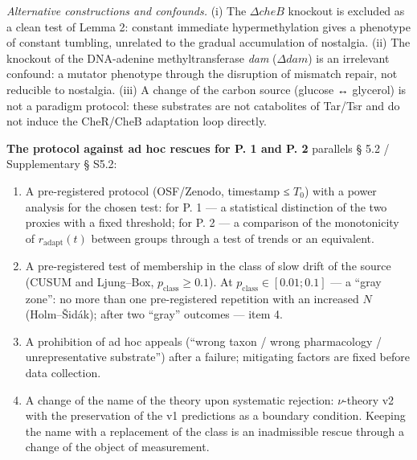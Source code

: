 \documentclass[pdflatex,sn-mathphys-ay]{sn-jnl}
\providecommand{\tightlist}{\setlength{\itemsep}{0pt}\setlength{\parskip}{0pt}}
\begin{document}
\emph{Alternative constructions and confounds.} (i) The \(\Delta cheB\) knockout is excluded as a clean test of Lemma 2: constant immediate hypermethylation gives a phenotype of constant tumbling, unrelated to the gradual accumulation of nostalgia. (ii) The knockout of the DNA-adenine methyltransferase \emph{dam} (\(\Delta dam\)) is an irrelevant confound: a mutator phenotype through the disruption of mismatch repair, not reducible to nostalgia. (iii) A change of the carbon source (glucose ↔ glycerol) is not a paradigm protocol: these substrates are not catabolites of Tar/Tsr and do not induce the CheR/CheB adaptation loop directly.



\textbf{The protocol against ad hoc rescues for P. 1 and P. 2} parallels § 5.2 / Supplementary § S5.2:



\begin{enumerate}

\def\labelenumi{\arabic{enumi}.}

\tightlist

\item

  A pre-registered protocol (OSF/Zenodo, timestamp ≤ \(T_0\)) with a power analysis for the chosen test: for P. 1 --- a statistical distinction of the two proxies with a fixed threshold; for P. 2 --- a comparison of the monotonicity of \(r_{\text{adapt}}(t)\) between groups through a test of trends or an equivalent.

\item

  A pre-registered test of membership in the class of slow drift of the source (CUSUM and Ljung--Box, \(p_{\text{class}} \ge 0.1\)). At \(p_{\text{class}} \in [0.01; 0.1]\) --- a ``gray zone'': no more than one pre-registered repetition with an increased \(N\) (Holm--Šidák); after two ``gray'' outcomes --- item 4.

\item

  A prohibition of ad hoc appeals (``wrong taxon / wrong pharmacology / unrepresentative substrate'') after a failure; mitigating factors are fixed before data collection.

\item

  A change of the name of the theory upon systematic rejection: \(\nu\)-theory v2 with the preservation of the v1 predictions as a boundary condition. Keeping the name with a replacement of the class is an inadmissible rescue through a change of the object of measurement.

\end{enumerate}
\end{document}

